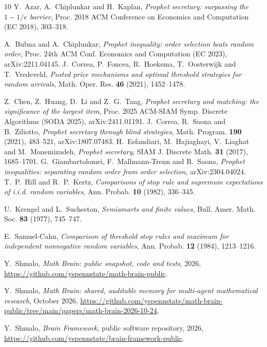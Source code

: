 \documentclass[11pt]{amsart}
\theoremstyle{remark}\newtheorem{remark}[theorem]{Remark}
\begin{document}
\begin{thebibliography}{10}
 Y.~Azar, A.~Chiplunkar and H.~Kaplan, \emph{Prophet secretary: surpassing the $1-1/e$ barrier}, Proc. 2018
ACM Conference on Economics and Computation (EC 2018), 303--318.

 A.~Bubna and A.~Chiplunkar, \emph{Prophet inequality: order selection beats random order}, Proc. 24th ACM
Conf. Economics and Computation (EC 2023), arXiv:2211.04145.
 J.~Correa, P.~Foncea, R.~Hoeksma, T.~Oosterwijk and T.~Vredeveld, \emph{Posted price mechanisms and
optimal threshold strategies for random arrivals}, Math. Oper. Res. \textbf{46} (2021), 1452--1478.

 Z.~Chen, Z.~Huang, D.~Li and Z.~G.~Tang, \emph{Prophet secretary and matching: the significance of the
largest item}, Proc. 2025 ACM-SIAM Symp. Discrete Algorithms (SODA 2025), arXiv:2411.01191.
 J.~Correa, R.~Saona and B.~Ziliotto, \emph{Prophet secretary through blind strategies}, Math. Program.
\textbf{190} (2021), 483--521, arXiv:1807.07483.
 H.~Esfandiari, M.~Hajiaghayi, V.~Liaghat and M.~Monemizadeh, \emph{Prophet secretary}, SIAM J. Discrete
Math. \textbf{31} (2017), 1685--1701.
 G.~Giambartolomei, F.~Mallmann-Trenn and R.~Saona, \emph{Prophet inequalities: separating random order
from order selection}, arXiv:2304.04024.
 T.~P.~Hill and R.~P.~Kertz, \emph{Comparisons of stop rule and supremum expectations of i.i.d. random
variables}, Ann. Probab. \textbf{10} (1982), 336--345.

 U.~Krengel and L.~Sucheston, \emph{Semiamarts and finite values}, Bull. Amer. Math. Soc. \textbf{83} (1977),
745--747.

 E.~Samuel-Cahn, \emph{Comparison of threshold stop rules and maximum for independent nonnegative random
variables}, Ann. Probab. \textbf{12} (1984), 1213--1216.

 Y.~Shmalo, \emph{Math Brain: public snapshot, code and tests}, 2026, \url{https://github.com/yspennstate/math-brain-public}.

 Y.~Shmalo, \emph{Math Brain: shared, auditable memory for multi-agent mathematical research}, October 2026, \url{https://github.com/yspennstate/math-brain-public/tree/main/papers/math-brain-2026-10-24}.

 Y.~Shmalo, \emph{Brain Framework}, public software repository, 2026, \url{https://github.com/yspennstate/brain-framework-public}.

\end{thebibliography}
\end{document}
